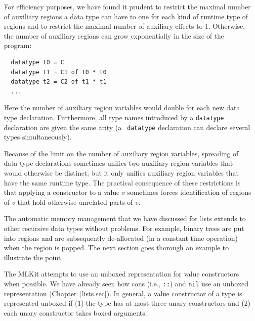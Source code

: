 \documentclass[12pt]{book}
\begin{document}
For efficiency purposes, we have found it prudent to restrict the
maximal number of auxiliary regions a data type can have to one for
each kind of runtime type of regions and to restrict the maximal
number of auxiliary effects to 1.  Otherwise, the number of auxiliary
regions can grow exponentially in the size of the program:
\begin{verbatim}
  datatype t0 = C
  datatype t1 = C1 of t0 * t0
  datatype t2 = C2 of t1 * t1
  ...
\end{verbatim}
Here the number of auxiliary region variables would double for each
new data type declaration.  Furthermore, all type names introduced by
a {\tt datatype} declaration are given the same arity (a {\tt
  datatype} declaration can declare several types simultaneously).

Because of the limit on the number of auxiliary region variables,
spreading of data type declarations sometimes unifies two auxiliary
region variables that would otherwise be distinct; but it only unifies
auxiliary region variables that have the same runtime type. The
practical consequence of these restrictions is that applying a
constructor to a value $v$ sometimes forces identification of regions
of $v$ that hold otherwise unrelated parts of $v$.

The automatic memory management that we have discussed for lists
extends to other recursive data types without problems. For example,
binary trees are put into regions and are subsequently de-allocated
(in a constant time operation) when the region is popped. The next
section goes thorough an example to illustrate the point.

The MLKit attempts to use an unboxed representation for value
constructors when possible. We have already seen how cons (i.e.,
\texttt{::}) and \texttt{nil} use an unboxed representation (Chapter~\ref{lists.sec}). In
general, a value constructor of a type is represented unboxed if
(1) the type has at most three unary constructors and (2) each unary
constructor takes boxed arguments.
\end{document}
